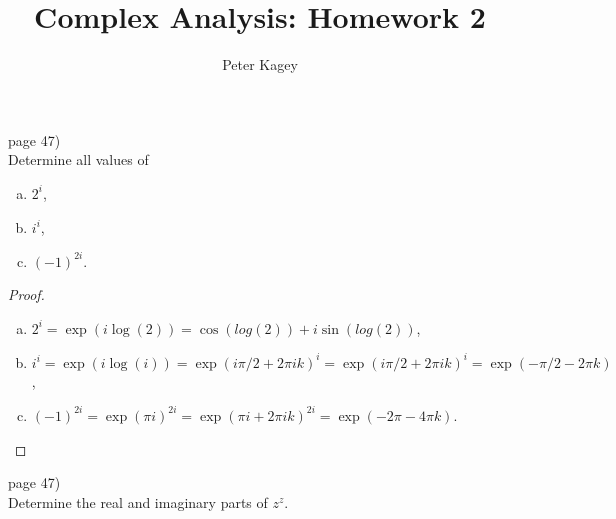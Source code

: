 \documentclass{article}
\newenvironment{problem}[2][Problem]{\begin{trivlist}
\item[\hskip \labelsep {\bfseries #1}\hskip \labelsep {\bfseries #2.}]}{\end{trivlist}}
\begin{document}
\title{Complex Analysis: Homework 2}
\author{Peter Kagey}

\maketitle

\begin{problem}{6} (page 47) \\
  Determine all values of \begin{enumerate}[(a)]
    \item $2^i$,
    \item $i^i$,
    \item $(-1)^{2i}$.
  \end{enumerate}
\end{problem}

\begin{proof} \text{} \\
  \begin{enumerate}[(a)]
    \item $2^i = \exp(i\log(2)) = \cos(log(2)) + i\sin(log(2))$,
    \item $i^i = \exp(i\log(i))
      = \exp(i\pi/2 + 2\pi i k)^i
      = \exp(i\pi/2 + 2\pi i k)^i
      = \exp(-\pi/2 - 2\pi k)
    $,
    \item $(-1)^{2i} = \exp(\pi i)^{2i}
      = \exp(\pi i + 2\pi i k)^{2i}
      = \exp(-2\pi - 4\pi k)
    $.
  \end{enumerate}
\end{proof}
\pagebreak

\begin{problem}{7} (page 47) \\
  Determine the real and imaginary parts of $z^z$.
\end{problem}
\end{document}
